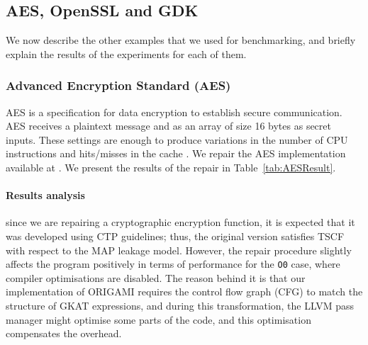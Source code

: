 



\subsection{AES, OpenSSL and GDK}
We now describe the other examples that we used for benchmarking, and briefly explain the results of the experiments for each of them. 

\subsubsection{Advanced Encryption Standard (AES)}
AES is a specification for data encryption to establish secure communication. AES receives a plaintext message %
 and as an array of size 16 bytes %
  as secret inputs. These settings are enough to produce variations in the number of CPU instructions and hits/misses in the cache \cite{Chalice}. We repair the AES implementation available at \cite{AESBasic}. %
  We present the results of the repair in Table~\ref{tab:AESResult}. 

\paragraph*{Results analysis} since we are repairing a cryptographic encryption function, it is expected that it was developed using CTP guidelines; thus, the original version satisfies TSCF with respect to the MAP leakage model. However, the repair procedure slightly affects the program positively in terms of performance for the \texttt{O0} case, where compiler optimisations are disabled. The reason behind it is that our implementation of ORIGAMI requires the control flow graph (CFG) to match the structure of GKAT expressions, and during this transformation, the LLVM pass manager might optimise some parts of the code, and this optimisation compensates the overhead.


